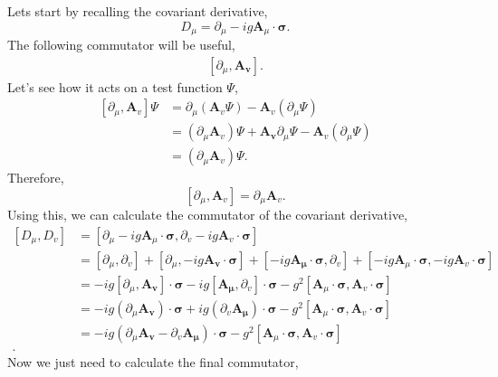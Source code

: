 \documentclass[working, oneside]{../../../Preambles/tuftebook}
\begin{document}
Lets start by recalling the covariant derivative,
\[
D_{\mu } = \partial_{\mu } - i g\mathbf{A}_{\mu }\cdot \mathbf{\sigma}
.\] 
The following commutator will be useful,
\begin{align*}
    \left[ \partial_\mu , \mathbf{A_v} \right] 
.\end{align*}
Let's see how it acts on a test function $\Psi$,
\begin{align*}
\left[ \partial_\mu, \mathbf{A}_{v}  \right] \Psi &= \partial_\mu \left( \mathbf{A}_v \Psi \right) - \mathbf{A}_v \left( \partial_\mu \Psi \right)  \\
 &= \left(   \partial_\mu \mathbf{A}_v \right)\Psi +\mathbf{A_v}\partial_\mu \Psi - \mathbf{A}_v \left( \partial_\mu \Psi \right)  \\
 &= \left( \partial_\mu \mathbf{A}_v \right) \Psi 
.\end{align*}
Therefore,
\[
\left[ \partial_\mu , \mathbf{A}_v \right] = \partial_{\mu }\mathbf{A}_v
.\] 
Using this, we can calculate the commutator of the covariant derivative,
\begin{align*}
    \left[ D_\mu , D_v \right] &= \left[ \partial_\mu  - ig \mathbf{A}_{\mu }\cdot\mathbf{\sigma}, \partial_v  - ig \mathbf{A}_{v}\cdot\mathbf{\sigma} \right] \\
    &= \left[ \partial_\mu , \partial_v \right] + \left[ \partial_\mu , -ig\mathbf{A_v}\cdot \mathbf{\sigma} \right] + \left[ -ig\mathbf{A_\mu }\cdot \mathbf{\sigma} , \partial_v\right]  + \left[ -ig\mathbf{A}_{\mu }\cdot \mathbf{\sigma}, -ig\mathbf{A}_v\cdot \mathbf{\sigma} \right] \\
    &=  -ig\left[ \partial_\mu , \mathbf{A_v}\right] \cdot \mathbf{\sigma} -ig\left[ \mathbf{A_\mu }, \partial_v \right] \cdot \mathbf{\sigma} -g^2 \left[ \mathbf{A}_{\mu }\cdot \mathbf{\sigma}, \mathbf{A}_v\cdot \mathbf{\sigma} \right] \\
    &=  -ig\left(\partial_\mu \mathbf{A_v}\right) \cdot \mathbf{\sigma} + ig\left(  \partial_v\mathbf{A_\mu } \right) \cdot \mathbf{\sigma} -g^2 \left[ \mathbf{A}_{\mu }\cdot \mathbf{\sigma}, \mathbf{A}_v\cdot \mathbf{\sigma} \right] \\
    &=  -ig\left(\partial_\mu \mathbf{A_v}-  \partial_v\mathbf{A_\mu } \right) \cdot \mathbf{\sigma} -g^2 \left[ \mathbf{A}_{\mu }\cdot \mathbf{\sigma}, \mathbf{A}_v\cdot \mathbf{\sigma} \right] \\
.\end{align*}
Now we just need to calculate the final commutator,
\end{document}
